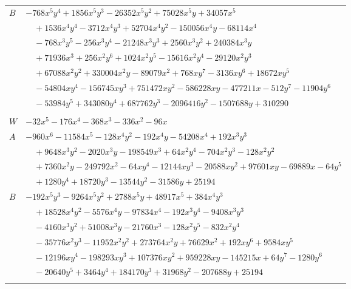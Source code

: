 \documentclass[11pt]{article}
\begin{document}
\begin{longtable}{@{}ll@{}}
$B$ & $-768x^{5}y^{4}+1856x^{5}y^{3}-26352x^{5}y^{2}+75028x^{5}y+34057x^{5}$\\
 & $\quad +1536x^{4}y^{4}-3712x^{4}y^{3}+52704x^{4}y^{2}-150056x^{4}y-68114x^{4}$\\
 & $\quad -768x^{3}y^{5}-256x^{3}y^{4}-21248x^{3}y^{3}+2560x^{3}y^{2}+240384x^{3}y$\\
 & $\quad +71936x^{3}+256x^{2}y^{6}+1024x^{2}y^{5}-15616x^{2}y^{4}-29120x^{2}y^{3}$\\
 & $\quad +67088x^{2}y^{2}+330004x^{2}y-89079x^{2}+768xy^{7}-3136xy^{6}+18672xy^{5}$\\
 & $\quad -54804xy^{4}-156745xy^{3}+751472xy^{2}-586228xy-477211x-512y^{7}-11904y^{6}$\\
 & $\quad -53984y^{5}+343080y^{4}+687762y^{3}-2096416y^{2}-1507688y+310290$\\
\addlinespace[3pt]
\multicolumn{2}{@{}l}{$i=36$, $m=8$, neighbours $8,11,15,16,23,25,33$}\\
$W$ & $-32x^{5}-176x^{4}-368x^{3}-336x^{2}-96x$\\
$A$ & $-960x^{6}-11584x^{5}-128x^{4}y^{2}-192x^{4}y-54208x^{4}+192x^{3}y^{3}$\\
 & $\quad +9648x^{3}y^{2}-2020x^{3}y-198549x^{3}+64x^{2}y^{4}-704x^{2}y^{3}-128x^{2}y^{2}$\\
 & $\quad +7360x^{2}y-249792x^{2}-64xy^{4}-12144xy^{3}-20588xy^{2}+97601xy-69889x-64y^{5}$\\
 & $\quad +1280y^{4}+18720y^{3}-13544y^{2}-31586y+25194$\\
$B$ & $-192x^{5}y^{3}-9264x^{5}y^{2}+2788x^{5}y+48917x^{5}+384x^{4}y^{3}$\\
 & $\quad +18528x^{4}y^{2}-5576x^{4}y-97834x^{4}-192x^{3}y^{4}-9408x^{3}y^{3}$\\
 & $\quad -4160x^{3}y^{2}+51008x^{3}y-21760x^{3}-128x^{2}y^{5}-832x^{2}y^{4}$\\
 & $\quad -35776x^{2}y^{3}-11952x^{2}y^{2}+273764x^{2}y+76629x^{2}+192xy^{6}+9584xy^{5}$\\
 & $\quad -12196xy^{4}-198293xy^{3}+107376xy^{2}+959228xy-145215x+64y^{7}-1280y^{6}$\\
 & $\quad -20640y^{5}+3464y^{4}+184170y^{3}+31968y^{2}-207688y+25194$\\
\addlinespace[3pt]
\end{longtable}
\endgroup
\end{document}
